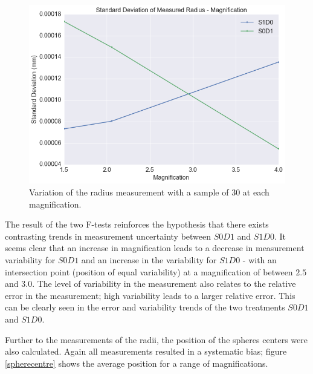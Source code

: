 \documentclass[
  twoside,
  11pt, a4paper,
  footinclude=true,
  headinclude=true,
  cleardoublepage=empty
]{scrbook}
\begin{document}
\begin{figure}[h!]
  \centering
    \includegraphics[width=\textwidth]{code/RadiusMeasurements/Plots_RadiusCentre_files/Plots_RadiusCentre_10_0.png}
    \caption{Variation of the radius measurement with a sample of 30 at each magnification.}
        \label{stdmeasuredradiusxsamples}
\end{figure}

The result of the two F-tests reinforces the hypothesis that there exists contrasting trends in measurement uncertainty between $S0D1$ and $S1D0$. It seems clear that an increase in magnification leads to a decrease in measurement variability for $S0D1$ and an increase in the variability for $S1D0$ - with an intersection point (position of equal variability) at a magnification of between $2.5$ and $3.0$. The level of variability in the measurement also relates to the relative error in the measurement; high variability leads to a larger relative error. This can be clearly seen in the error and variability trends of the two treatments $S0D1$ and $S1D0$.

Further to the measurements of the radii, the position of the spheres centers were also calculated. Again all measurements resulted in a systematic bias; figure \ref{spherecentre} shows the average position for a range of magnifications.
\end{document}
